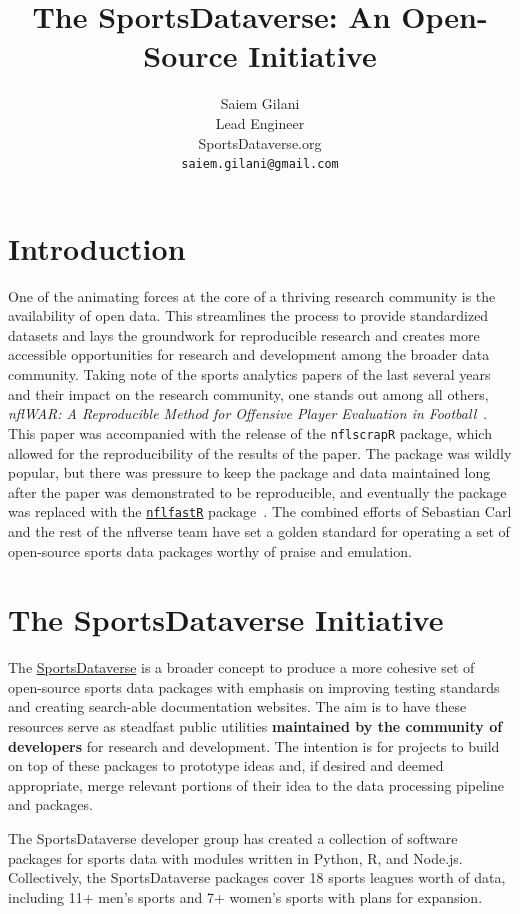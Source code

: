 \documentclass[12pt]{article}
\title{The SportsDataverse: An Open-Source Initiative}
\author{
 Saiem Gilani \\
  Lead Engineer\\
  SportsDataverse.org\\
  \texttt{saiem.gilani@gmail.com} \\
}
\begin{document}
 \maketitle

\section{Introduction}
One of the animating forces at the core of a thriving research community is the availability of open data. This streamlines the process to provide standardized datasets and lays the groundwork for reproducible research and creates more accessible opportunities for research and development among the broader data community.  Taking note of the sports analytics papers of the last several years and their impact on the research community, one stands out among all others, \emph{nflWAR: A Reproducible Method for Offensive Player Evaluation in Football}~\cite{yurko_ventura_horowitz_2019}. This paper was accompanied with the release of the \texttt{nflscrapR} package, which allowed for the reproducibility of the results of the paper. The package was wildly popular, but there was pressure to keep the package and data maintained long after the paper was demonstrated to be reproducible, and eventually the package was replaced with the \href{https://www.nflfastR.com}{\texttt{nflfastR}} package~\cite{carl_baldwin_2020}. The combined efforts of Sebastian Carl and the rest of the nflverse team have set a golden standard for operating a set of open-source sports data packages worthy of praise and emulation. 

\section{The SportsDataverse Initiative}
The \href{https://sportsdataverse.org}{SportsDataverse} is a broader concept to produce a more cohesive set of open-source sports data packages with emphasis on improving testing standards and creating search-able documentation websites. The aim is to have these resources serve as steadfast public utilities \textbf{maintained by the community of developers} for research and development. The intention is for projects to build on top of these packages to prototype ideas and, if desired and deemed appropriate, merge relevant portions of their idea to the data processing pipeline and packages.

The SportsDataverse developer group has created a collection of software packages for sports data with modules written in Python, R, and Node.js. Collectively, the SportsDataverse packages cover 18 sports leagues worth of data, including 11+ men's sports and 7+ women's sports with plans for expansion. 
\end{document}
